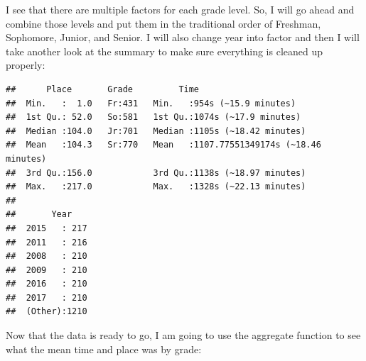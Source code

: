 \documentclass[
]{article}
\newenvironment{Shaded}{\begin{snugshade}}{\end{snugshade}}
\newcommand{\DataTypeTok}[1]{\textcolor[rgb]{0.13,0.29,0.53}{#1}}
\newcommand{\KeywordTok}[1]{\textcolor[rgb]{0.13,0.29,0.53}{\textbf{#1}}}
\newcommand{\NormalTok}[1]{#1}
\newcommand{\OperatorTok}[1]{\textcolor[rgb]{0.81,0.36,0.00}{\textbf{#1}}}
\newcommand{\StringTok}[1]{\textcolor[rgb]{0.31,0.60,0.02}{#1}}
\begin{document}
I see that there are multiple factors for each grade level. So, I will
go ahead and combine those levels and put them in the traditional order
of Freshman, Sophomore, Junior, and Senior. I will also change year into
factor and then I will take another look at the summary to make sure
everything is cleaned up properly:

\begin{Shaded}
\end{Shaded}

\begin{verbatim}
##      Place       Grade         Time                                   
##  Min.   :  1.0   Fr:431   Min.   :954s (~15.9 minutes)                
##  1st Qu.: 52.0   So:581   1st Qu.:1074s (~17.9 minutes)               
##  Median :104.0   Jr:701   Median :1105s (~18.42 minutes)              
##  Mean   :104.3   Sr:770   Mean   :1107.77551349174s (~18.46 minutes)  
##  3rd Qu.:156.0            3rd Qu.:1138s (~18.97 minutes)              
##  Max.   :217.0            Max.   :1328s (~22.13 minutes)              
##                                                                       
##       Year     
##  2015   : 217  
##  2011   : 216  
##  2008   : 210  
##  2009   : 210  
##  2016   : 210  
##  2017   : 210  
##  (Other):1210
\end{verbatim}

Now that the data is ready to go, I am going to use the aggregate
function to see what the mean time and place was by grade:
\end{document}
